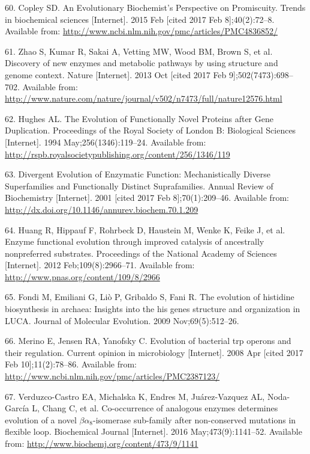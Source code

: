 \documentclass[12pt,twoside]{reedthesis}
\begin{document}
  \hypertarget{ref-copley_evolutionary_2015}{}
  60. Copley SD. An Evolutionary Biochemist's Perspective on Promiscuity.
  Trends in biochemical sciences {[}Internet{]}. 2015 Feb {[}cited 2017
  Feb 8{]};40(2):72--8. Available from:
  \url{http://www.ncbi.nlm.nih.gov/pmc/articles/PMC4836852/}
  
  \hypertarget{ref-zhao_discovery_2013}{}
  61. Zhao S, Kumar R, Sakai A, Vetting MW, Wood BM, Brown S, et al.
  Discovery of new enzymes and metabolic pathways by using structure and
  genome context. Nature {[}Internet{]}. 2013 Oct {[}cited 2017 Feb
  9{]};502(7473):698--702. Available from:
  \url{http://www.nature.com/nature/journal/v502/n7473/full/nature12576.html}
  
  \hypertarget{ref-hughes_evolution_1994}{}
  62. Hughes AL. The Evolution of Functionally Novel Proteins after Gene
  Duplication. Proceedings of the Royal Society of London B: Biological
  Sciences {[}Internet{]}. 1994 May;256(1346):119--24. Available from:
  \url{http://rspb.royalsocietypublishing.org/content/256/1346/119}
  
  \hypertarget{ref-gerlt_divergent_2001}{}
  63. Divergent Evolution of Enzymatic Function: Mechanistically Diverse
  Superfamilies and Functionally Distinct Suprafamilies. Annual Review of
  Biochemistry {[}Internet{]}. 2001 {[}cited 2017 Feb 8{]};70(1):209--46.
  Available from: \url{http://dx.doi.org/10.1146/annurev.biochem.70.1.209}
  
  \hypertarget{ref-huang_enzyme_2012}{}
  64. Huang R, Hippauf F, Rohrbeck D, Haustein M, Wenke K, Feike J, et al.
  Enzyme functional evolution through improved catalysis of ancestrally
  nonpreferred substrates. Proceedings of the National Academy of Sciences
  {[}Internet{]}. 2012 Feb;109(8):2966--71. Available from:
  \url{http://www.pnas.org/content/109/8/2966}
  
  \hypertarget{ref-fondi_evolution_2009}{}
  65. Fondi M, Emiliani G, Liò P, Gribaldo S, Fani R. The evolution of
  histidine biosynthesis in archaea: Insights into the his genes structure
  and organization in LUCA. Journal of Molecular Evolution. 2009
  Nov;69(5):512--26.
  
  \hypertarget{ref-merino_evolution_2008}{}
  66. Merino E, Jensen RA, Yanofsky C. Evolution of bacterial trp operons
  and their regulation. Current opinion in microbiology {[}Internet{]}.
  2008 Apr {[}cited 2017 Feb 10{]};11(2):78--86. Available from:
  \url{http://www.ncbi.nlm.nih.gov/pmc/articles/PMC2387123/}
  
  \hypertarget{ref-verduzco-castro_co-occurrence_2016}{}
  67. Verduzco-Castro EA, Michalska K, Endres M, Juárez-Vazquez AL,
  Noda-García L, Chang C, et al. Co-occurrence of analogous enzymes
  determines evolution of a novel \(\beta\alpha_8\)-isomerase sub-family
  after non-conserved mutations in flexible loop. Biochemical Journal
  {[}Internet{]}. 2016 May;473(9):1141--52. Available from:
  \url{http://www.biochemj.org/content/473/9/1141}
  
\end{document}
